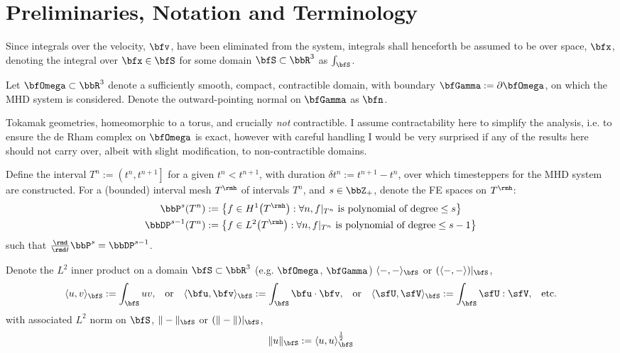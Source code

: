 \section*{Preliminaries, Notation and Terminology}
    Since integrals over the velocity, $\bfv$, have been eliminated from the system, integrals shall henceforth be assumed to be over space, $\bfx$, denoting the integral over $\bfx  \in  \bfS$ for some domain $\bfS  \subset  \bbR^{3}$ as $\int_{\bfS}$.

    Let $\bfOmega  \subset  \bbR^{3}$ denote a sufficiently smooth, compact, contractible domain, with boundary $\bfGamma  :=  \partial\bfOmega$, on which the MHD system is considered. Denote the outward-pointing normal on $\bfGamma$ as $\bfn$.

    \begin{remark}
        Tokamak geometries, homeomorphic to a torus, and crucially \emph{not} contractible. I assume contractability here to simplify the analysis, i.e. to ensure the de Rham complex on $\bfOmega$ is exact, however with careful handling I would be very surprised if any of the results here should not carry over, albeit with slight modification, to non-contractible domains.
    \end{remark}

    Define the interval $T^{n}  :=  \left(t^{n}, t^{n + 1}\right]$ for a given $t^{n}  <  t^{n + 1}$, with duration $\delta t^{n}  :=  t^{n + 1} - t^{n}$, over which timesteppers for the MHD system are constructed. For a (bounded) interval mesh $T^{\rmh}$ of intervals $T^{n}$, and $s \in \bbZ_{+}$, denote the FE spaces on $T^{\rmh}$:
    \begin{align}
        \bbP^{s}\!\left(T^{n}\right)       &:=  \left\{f \in H^{1}\!\left(T^{\rmh}\right) : \forall n, f|_{T^{n}} \text{ is polynomial of degree} \leq s\right\}  \\
        \bbDP^{s - 1}\!\left(T^{n}\right)  &:=  \left\{f \in L^{2}\!\left(T^{\rmh}\right) : \forall n, f|_{T^{n}} \text{ is polynomial of degree} \leq s - 1\right\}
    \end{align}
    such that $\frac{\rmd}{\rmd t}\bbP^{s}  =  \bbDP^{s - 1}$.

    Denote the $L^{2}$ inner product on a domain $\bfS  \subset  \bbR^{3}$ (e.g. $\bfOmega$, $\bfGamma$) $\langle-, -\rangle_{\bfS}$ or $(\langle-, -\rangle)|_{\bfS}$,
    \begin{align}
        \langle u,    v   \rangle_{\bfS}  :=  \int_{\bfS}uv,  &&
        \text{or}  &&
        \langle \bfu, \bfv\rangle_{\bfS}  :=  \int_{\bfS}\bfu\cdot\bfv,  &&
        \text{or}  &&
        \langle \sfU, \sfV\rangle_{\bfS}  :=  \int_{\bfS}\sfU:\sfV,  &&
        \text{etc.}
    \end{align}
    with associated $L^{2}$ norm on $\bfS$, $\|-\|_{\bfS}$ or $(\|-\|)|_{\bfS}$,
    \begin{equation}
        \|u\|_{\bfS}  :=  \langle u, u\rangle_{\bfS}^{\frac{1}{2}}
    \end{equation}

